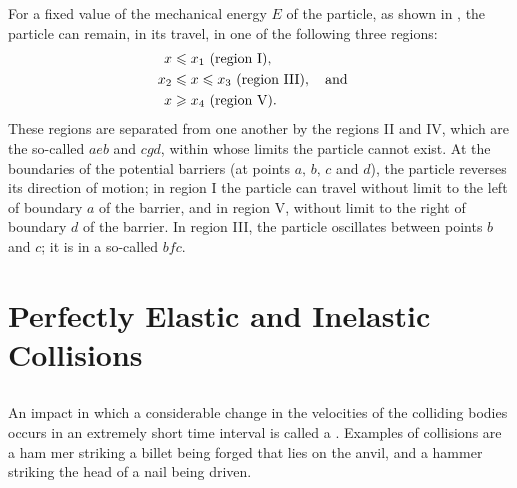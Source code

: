 For a fixed value of the mechanical energy $E$ of the particle, as shown in , the particle can remain, in its travel, in one of the following three regions: 
\begin{align*}%
x & \leqslant x_{1} \,\, \textrm{(region I)},\\
x_{2} & \leqslant x \leqslant x_{3}\,\, \textrm{(region III)}, \qand \\
x & \geqslant x_{4}\,\, \textrm{(region V)}.
\end{align*}
These regions are separated from one another by the regions II and IV, which are the so-called  $aeb$ and $cgd$, within whose limits the particle cannot exist. At the boundaries of the potential barriers (at points $a,\, b,\, c$ and $d$), the particle reverses its direction of motion; in region I the particle can travel without limit to the left of boundary $a$ of the barrier, and in region V, without limit to the right of bound­ary $d$ of the barrier. In region III, the particle oscillates be­tween points $b$ and $c$; it is in a so-called  $bfc$.

\section{Perfectly Elastic and Inelastic Collisions}
\label{sec-3.5}

\subsection{}\label{3.5.1} An impact in which a considerable change in the veloc­ities of the colliding bodies occurs in an extremely short time interval is called a . Examples of collisions are a ham­ mer striking a billet being forged that lies on the anvil, and a hammer striking the head of a nail being driven.

